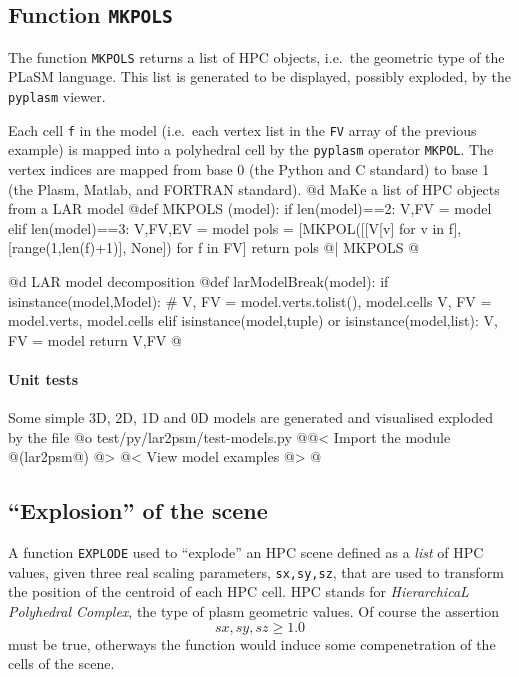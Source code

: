 \documentclass[11pt,oneside]{article}    %
\begin{document}
\subsection{Function \texttt{MKPOLS}}

The function \texttt{MKPOLS} returns a list of HPC objects, i.e.~the geometric type of the PLaSM language. This list is generated to be displayed, possibly exploded, by the \texttt{pyplasm} viewer. 

Each cell \texttt{f} in the model (i.e.~each vertex list in the \texttt{FV} array of the previous example) is mapped into a polyhedral cell by the \texttt{pyplasm} operator \texttt{MKPOL}. The vertex indices are mapped from base 0 (the Python and C standard) to base 1 (the Plasm, Matlab, and FORTRAN standard).
@d MaKe a list of HPC objects from a LAR model
@{def MKPOLS (model):
    if len(model)==2: V,FV = model
    elif len(model)==3: V,FV,EV = model
    pols = [MKPOL([[V[v] for v in f],[range(1,len(f)+1)], None]) for f in FV]
    return pols  
@| MKPOLS @}

@d LAR model decomposition
@{def larModelBreak(model):
    if isinstance(model,Model):
        # V, FV = model.verts.tolist(), model.cells
        V, FV = model.verts, model.cells
    elif isinstance(model,tuple) or isinstance(model,list):
        V, FV = model
    return V,FV
@}

\paragraph{Unit tests}
Some simple 3D, 2D, 1D and 0D models are generated and visualised exploded by the file
@o test/py/lar2psm/test-models.py
@{@< Import the module @(lar2psm@) @>
@< View model examples @>
@}

\subsection{``Explosion'' of the scene}

A function \texttt{EXPLODE} used to ``explode'' an HPC scene defined as a \emph{list} of HPC values, given three real scaling parameters, \texttt{sx,sy,sz}, that are used to transform the position of the centroid of each HPC cell. HPC stands for \emph{HierarchicaL Polyhedral Complex}, the  type of plasm geometric values. Of course the assertion
\[
sx,sy,sz \geq 1.0
\]
must be true, otherways the function would induce some compenetration of the cells of the scene.
\end{document}
